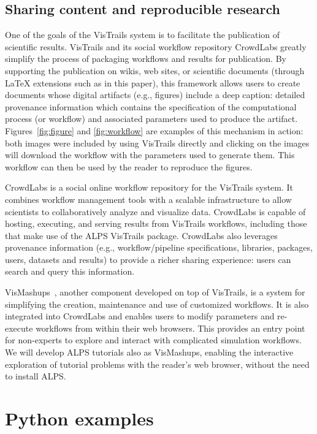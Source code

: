 \documentclass[12pt]{iopart}
\newcommand{\eg}{e.g.,\xspace}
\begin{document}
\subsection{Sharing content and reproducible research}

One of the goals of the VisTrails system is to
facilitate the publication of scientific results. VisTrails and its social workflow repository
CrowdLabs greatly simplify the process of packaging workflows and
results for publication. By supporting the publication on wikis, 
web sites, or scientific documents (through LaTeX extensions such as in this paper), this framework allows users to create
documents whose digital artifacts (\eg figures) include a deep
caption: detailed provenance information which contains the
specification of the computational process (or workflow) and
associated parameters used to produce the
artifact. Figures~\ref{fig:figure} and \ref{fig:workflow} are examples
of this mechanism in action: both images were included by using
VisTrails directly and clicking on the images will download the
workflow with the parameters used to generate them. This workflow can then be used by the reader to reproduce the figures.

CrowdLabs is a social online workflow repository for the VisTrails
system. It combines workflow management tools with a scalable
infrastructure to allow scientists to collaboratively analyze and
visualize data. CrowdLabs is capable of hosting, executing, and
serving results from VisTrails workflows, including those that make
use of the ALPS VisTrails package. CrowdLabs also leverages provenance
information (\eg workflow/pipeline specifications, libraries,
packages, users, datasets and results) to provide a richer sharing
experience: users can search and query this information.

VisMashups~\cite{Santos09}, another component developed on top of VisTrails, is a system for simplifying the creation,
maintenance and use of customized workflows. It is also
integrated into CrowdLabs and enables users to modify parameters and
re-execute workflows from within their web browsers. This provides an
entry point for non-experts to explore and interact with complicated
simulation workflows. We will develop ALPS tutorials also as VisMashups, enabling the interactive exploration of tutorial problems with the reader's web browser, without the need to install ALPS.

\section{Python examples}
\end{document}
